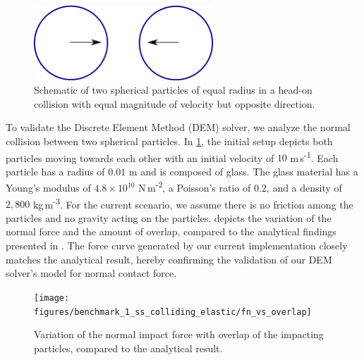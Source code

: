 \documentclass[preprint,12pt]{elsarticle}
\begin{document}
\begin{figure}[!htpb]
  \centering
  \includegraphics[width=0.6\textwidth]{images/results_dem_1_validation_particle_particle_impact/dem_01_head_on_schematic}
  \caption{Schematic of two spherical particles of equal radius in a
    head-on collision with equal magnitude of velocity but opposite direction.}
  \label{fig:result:dem_1_schematic}
\end{figure}
To validate the Discrete Element Method (DEM) solver, we analyze the normal
collision between two spherical particles.  In
\cref{fig:result:dem_1_schematic}, the initial setup depicts both particles
moving towards each other with an initial velocity of $10$
m\,s\textsuperscript{-1}.  Each particle has a radius of $0.01$ m and is composed
of glass. The glass material has a Young's modulus of $4.8 \times 10^{10}$
N\,m\textsuperscript{-2}, a Poisson's ratio of $0.2$, and a density of $2,800$
kg\,m\textsuperscript{-3}.  For the current scenario, we assume there is no
friction among the particles and no gravity acting on the particles.
 depicts the variation of the normal
force and the amount of overlap, compared to the analytical findings presented
in \cite{chung2011benchmark}. The force curve generated by our current
implementation closely matches the analytical result, hereby confirming the
validation of our DEM solver's model for normal contact force.
\begin{figure}[!htpb]
  \centering
  \texttt{[image: figures/benchmark\_1\_ss\_colliding\_elastic/fn\_vs\_overlap]}
  \caption{Variation of the normal impact force with overlap of the impacting
    particles, compared to the analytical result.}
  \label{fig:result:dem_1_force_vs_overlap}
\end{figure}


\FloatBarrier%
\end{document}
